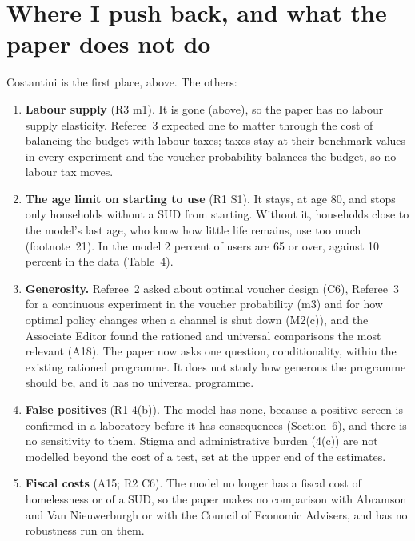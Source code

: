 \documentclass[11pt]{article}
\begin{document}
\section*{\color{respred}Where I push back, and what the paper does not do}

{\color{respred}
Costantini is the first place, above. The others:
\begin{enumerate}
\item \open \textbf{Labour supply} (R3 m1). It is gone (above), so the paper has no labour
supply elasticity. Referee~3 expected one to matter through the cost of balancing the budget
with labour taxes; taxes stay at their benchmark values in every experiment and the voucher
probability balances the budget, so no labour tax moves.

\item \open \textbf{The age limit on starting to use} (R1 S1). It stays, at age 80, and stops only
households without a SUD from starting. Without it, households close to the model's last age,
who know how little life remains, use too much (footnote~21). In the model 2 percent of users
are 65 or over, against 10 percent in the data (Table~4).

\item \open \textbf{Generosity.} Referee~2 asked about optimal voucher design (C6), Referee~3 for
a continuous experiment in the voucher probability (m3) and for how optimal policy changes when
a channel is shut down (M2(c)), and the Associate Editor found the rationed and universal
comparisons the most relevant (A18). The paper now asks one question, conditionality, within
the existing rationed programme. It does not study how generous the programme should be, and it
has no universal programme.

\item \open \textbf{False positives} (R1 4(b)). The model has none, because a positive screen is
confirmed in a laboratory before it has consequences (Section~6), and there is no sensitivity to
them. Stigma and administrative burden (4(c)) are not modelled beyond the cost of a test, set
at the upper end of the estimates.

\item \open \textbf{Fiscal costs} (A15; R2 C6). The model no longer has a fiscal cost of
homelessness or of a SUD, so the paper makes no comparison with Abramson and Van Nieuwerburgh or
with the Council of Economic Advisers, and has no robustness run on them.


\end{enumerate}}
\end{document}
